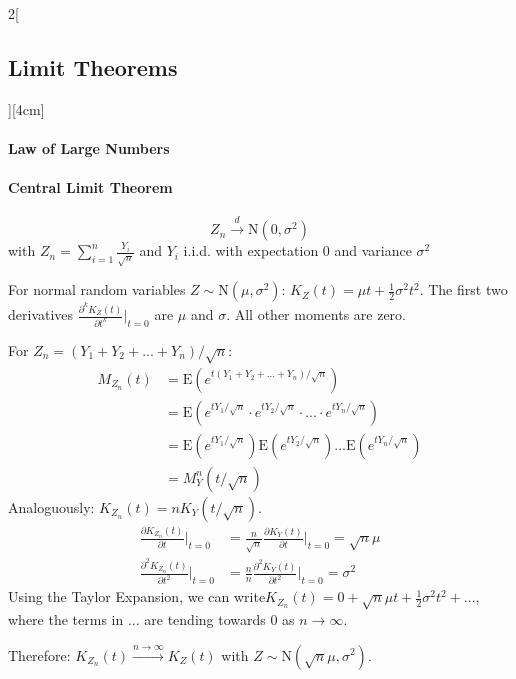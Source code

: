 \documentclass[8pt]{extarticle}
\begin{document}
\begin{multicols}{2}[\subsection{Limit Theorems}][4cm]

  \paragraph{Law of Large Numbers}
  
  \paragraph{Central Limit Theorem}
  
  $$Z_n \overset{d}{\longrightarrow} \mathrm{N}(0, \sigma^2)$$
  with  $Z_n = \sum_{i=1}^{n} \frac{Y_i}{\sqrt{n}}$ and $Y_i$ i.i.d. with expectation $0$ and variance $\sigma^2$
\begin{Proof}
For normal random variables $Z \sim \mathrm{N}(\mu, \sigma^2)$: $K_Z(t)=\mu t + \frac{1}{2}\sigma^2t^2$. The first two derivatives $\frac{\partial^kK_Z(t)}{\partial t^k} \bigg|_{t = 0}$ are $\mu$ and $\sigma$. All other moments are zero. 

\noindent For $Z_n = (Y_1 + Y_2 + ... +Y_n)/\sqrt{n}$:
\begin{align*}
M_{Z_n}(t) &= \mathrm{E}\left(e^{t(Y_1 + Y_2 + ... +Y_n)/\sqrt{n}}\right)\\
&= \mathrm{E}\left(e^{tY_1/\sqrt{n}} \cdot e^{tY_2/\sqrt{n}}\cdot ... \cdot e^{tY_n/\sqrt{n}}\right) \\
&= \mathrm{E}\left(e^{tY_1/\sqrt{n}}\right) \mathrm{E}\left(e^{tY_2/\sqrt{n}}\right) ... \mathrm{E}\left(e^{tY_n/\sqrt{n}}\right) \\
&= M_Y^n(t/\sqrt{n})
\end{align*}
Analoguously: $K_{Z_n}(t) = nK_Y(t/\sqrt{n})$.
\begin{align*}
 \frac{\partial K_{Z_n}(t)}{\partial t} \bigg|_{t = 0} &= \frac{n}{\sqrt{n}} \frac{\partial K_Y(t)}{\partial t} \bigg|_{t = 0} = \sqrt{n}\mu \\
 \frac{\partial^2K_{Z_n}(t)}{\partial t^2} \bigg|_{t = 0} &= \frac{n}{n} \frac{\partial^2 K_Y(t)}{\partial t^2} \bigg|_{t = 0} = \sigma^2
\end{align*}
Using the Taylor Expansion, we can write$K_{Z_n}(t) = 0 + \sqrt{n}\mu t + \frac{1}{2}\sigma^2t^2 + ...$, where the terms in $...$ are tending towards 0 as $n \rightarrow \infty$.

\noindent Therefore: $K_{Z_n}(t) \overset{n\rightarrow\infty}{\longrightarrow} K_{Z}(t)$ with $Z \sim \mathrm{N}(\sqrt{n}\mu,\sigma^2)$.
\end{Proof}

\end{multicols}
\end{document}
